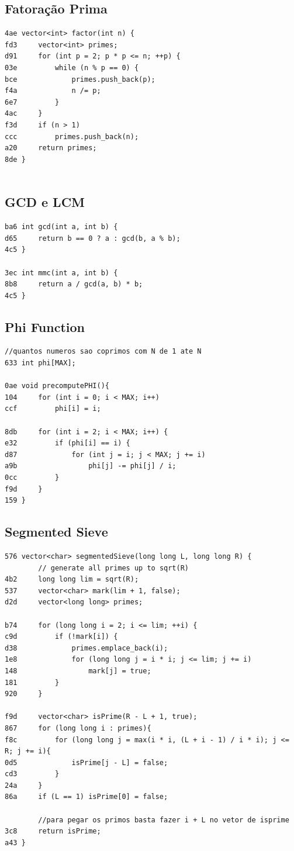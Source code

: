 \documentclass[11pt, a4paper, twoside]{article}
\begin{document}
\subsection{Fatoração Prima}
\begin{lstlisting}
4ae vector<int> factor(int n) {
fd3     vector<int> primes;
d91     for (int p = 2; p * p <= n; ++p) {
03e         while (n % p == 0) {
bce             primes.push_back(p);
f4a             n /= p;
6e7         }
4ac     }
f3d     if (n > 1) 
ccc         primes.push_back(n);
a20     return primes;
8de }


\end{lstlisting}

\subsection{GCD e LCM}
\begin{lstlisting}
ba6 int gcd(int a, int b) {
d65     return b == 0 ? a : gcd(b, a % b);
4c5 }

3ec int mmc(int a, int b) {
8b8     return a / gcd(a, b) * b;
4c5 }
\end{lstlisting}

\subsection{Phi Function}
\begin{lstlisting}
//quantos numeros sao coprimos com N de 1 ate N
633 int phi[MAX];

0ae void precomputePHI(){
104     for (int i = 0; i < MAX; i++)
ccf         phi[i] = i;
    
8db     for (int i = 2; i < MAX; i++) {
e32         if (phi[i] == i) {
d87             for (int j = i; j < MAX; j += i)
a9b                 phi[j] -= phi[j] / i;
0cc         }
f9d     }
159 }
\end{lstlisting}

\subsection{Segmented Sieve}
\begin{lstlisting}
576 vector<char> segmentedSieve(long long L, long long R) {
        // generate all primes up to sqrt(R)
4b2     long long lim = sqrt(R);
537     vector<char> mark(lim + 1, false);
d2d     vector<long long> primes;
    
b74     for (long long i = 2; i <= lim; ++i) {
c9d         if (!mark[i]) {
d38             primes.emplace_back(i);
1e8             for (long long j = i * i; j <= lim; j += i)
148                 mark[j] = true;
181         }
920     }
    
f9d     vector<char> isPrime(R - L + 1, true);
867     for (long long i : primes){
f8c         for (long long j = max(i * i, (L + i - 1) / i * i); j <= R; j += i){       
0d5             isPrime[j - L] = false;
cd3         }
24a     }
86a     if (L == 1) isPrime[0] = false;
        
        //para pegar os primos basta fazer i + L no vetor de isprime 
3c8     return isPrime;
a43 }
\end{lstlisting}
\end{document}
